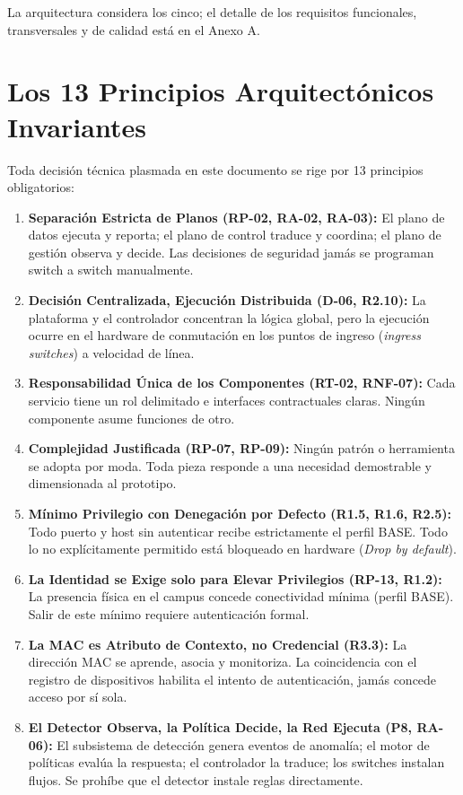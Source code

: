 \documentclass[11pt,a4paper]{report}
\begin{document}
La arquitectura considera los cinco; el detalle de los requisitos funcionales, transversales y de calidad está en el Anexo A.

\section{Los 13 Principios Arquitectónicos Invariantes}
Toda decisión técnica plasmada en este documento se rige por 13 principios obligatorios:
\begin{enumerate}[label=\textbf{P\arabic*.}, leftmargin=*]
    \item \textbf{Separación Estricta de Planos (RP-02, RA-02, RA-03):} El plano de datos ejecuta y reporta; el plano de control traduce y coordina; el plano de gestión observa y decide. Las decisiones de seguridad jamás se programan switch a switch manualmente.
    \item \textbf{Decisión Centralizada, Ejecución Distribuida (D-06, R2.10):} La plataforma y el controlador concentran la lógica global, pero la ejecución ocurre en el hardware de conmutación en los puntos de ingreso (\emph{ingress switches}) a velocidad de línea.
    \item \textbf{Responsabilidad Única de los Componentes (RT-02, RNF-07):} Cada servicio tiene un rol delimitado e interfaces contractuales claras. Ningún componente asume funciones de otro.
    \item \textbf{Complejidad Justificada (RP-07, RP-09):} Ningún patrón o herramienta se adopta por moda. Toda pieza responde a una necesidad demostrable y dimensionada al prototipo.
    \item \textbf{Mínimo Privilegio con Denegación por Defecto (R1.5, R1.6, R2.5):} Todo puerto y host sin autenticar recibe estrictamente el perfil BASE. Todo lo no explícitamente permitido está bloqueado en hardware (\emph{Drop by default}).
    \item \textbf{La Identidad se Exige solo para Elevar Privilegios (RP-13, R1.2):} La presencia física en el campus concede conectividad mínima (perfil BASE). Salir de este mínimo requiere autenticación formal.
    \item \textbf{La MAC es Atributo de Contexto, no Credencial (R3.3):} La dirección MAC se aprende, asocia y monitoriza. La coincidencia con el registro de dispositivos habilita el intento de autenticación, jamás concede acceso por sí sola.
    \item \textbf{El Detector Observa, la Política Decide, la Red Ejecuta (P8, RA-06):} El subsistema de detección genera eventos de anomalía; el motor de políticas evalúa la respuesta; el controlador la traduce; los switches instalan flujos. Se prohíbe que el detector instale reglas directamente.

\end{enumerate}
\end{document}
